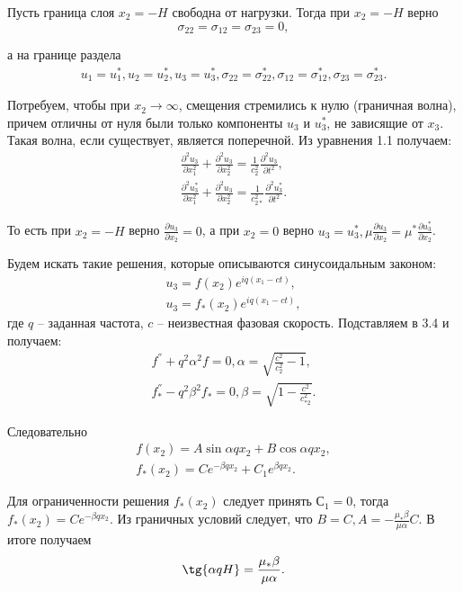 Пусть граница слоя $x_2 = -H$ свободна от нагрузки. Тогда при $x_2 = -H$ верно
\begin{equation}
\sigma_{22} = \sigma_{12} = \sigma_{23} = 0,
\end{equation}

а на границе раздела
\begin{eqnarray}
u_1 = u_1^*, u_2 = u_2^*, u_3 = u_3^*,
\sigma_{22} = \sigma_{22}^*, \sigma_{12} = \sigma_{12}^*, \sigma_{23} = \sigma_{23}^*.
\end{eqnarray}

Потребуем, чтобы при $x_2 \to \infty$, смещения стремились к нулю (граничная волна), причем отличны от нуля были только компоненты $u_3$ и $u_3^*$, не зависящие от $x_3$. Такая волна, если существует, является поперечной. Из уравнения 1.1 получаем:
\begin{eqnarray}
\frac{\partial^2 u_3}{\partial x_1^2} + \frac{\partial^2 u_3}{\partial x_2^2} = \frac{1}{c_2^2} \frac{\partial^2 u_3}{\partial t^2}, \\
\frac{\partial^2 u_3^*}{\partial x_1^2} + \frac{\partial^2 u_3}{\partial x_2^2} = \frac{1}{c_{2*}^2} \frac{\partial^2 u_3^*}{\partial t^2}.
\end{eqnarray}

То есть при $x_2 = -H$ верно $\frac{\partial u_3}{\partial x_2} = 0$, а при $x_2 = 0$ верно $u_3 = u_3^*, \mu\frac{\partial u_3}{\partial x_2} = \mu^*\frac{\partial u_3^*}{\partial x_2}$.

Будем искать такие решения, которые описываются синусоидальным законом:
\begin{eqnarray}
u_3 = f(x_2)e^{iq(x_1-ct)}, \\
u_3 = f_*(x_2)e^{iq(x_1-ct)},
\end{eqnarray}
где $q$ -- заданная частота, $c$ -- неизвестная фазовая скорость. Подставляем в 3.4 и получаем:
\begin{eqnarray}
f^{''} + q^2 \alpha^2 f = 0, \alpha = \sqrt{\frac{c^2}{c_2^2} - 1}, \\
f_*^{''} - q^2 \beta^2 f_* = 0, \beta = \sqrt{1 - \frac{c^2}{c_{*2}^2}}.
\end{eqnarray}

Следовательно
\begin{eqnarray}
f(x_2) = A\sin{\alpha q x_2} + B\cos{\alpha q x_2}, \\
f_*(x_2) = Ce^{-\beta q x_2} + C_1e^{\beta q x_2}.
\end{eqnarray}

Для ограниченности решения $f_*(x_2)$ следует принять $С_1 = 0$, тогда $f_*(x_2) = Ce^{-\beta q x_2}$. Из граничных условий следует, что $B = C, A = - \frac{\mu_* \beta}{\mu \alpha}C$. В итоге получаем
\begin{eqnarray}
\tg{\alpha qH} = \frac{\mu_* \beta}{\mu \alpha}.
\end{eqnarray}

